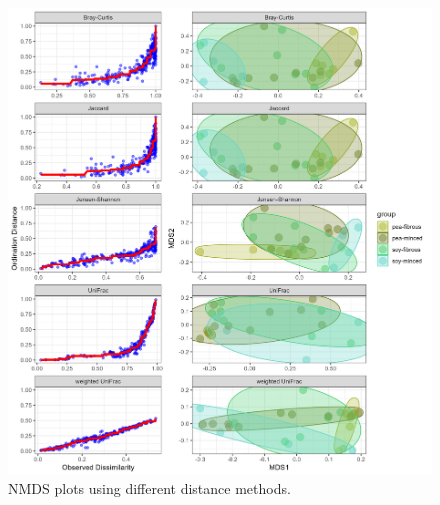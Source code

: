\documentclass[preprint,3p,
a4paper]{elsarticle} %
\begin{document}
\begin{figure}

{\centering \includegraphics[width=1\linewidth]{NMDSplots} 

}

\caption{\label{figSM2} NMDS plots using different distance methods.  }\label{fig:figSM2}
\end{figure}
\end{document}
